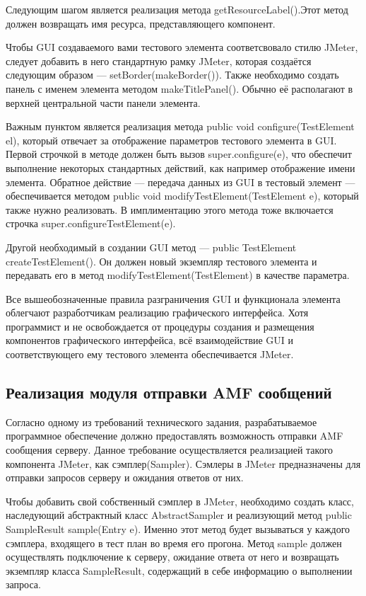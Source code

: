 Следующим шагом является реализация метода getResourceLabel().Этот метод должен возвращать имя ресурса,
представляющего компонент.

Чтобы GUI создаваемого вами тестового элемента соответсвовало стилю JMeter, следует добавить в него стандартную
рамку JMeter, которая создаётся следующим образом --- setBorder(makeBorder()). Также необходимо создать
панель с именем элемента методом makeTitlePanel(). Обычно её располагают в верхней центральной части панели
элемента.

Важным пунктом является реализация метода public void configure(TestElement el), который отвечает за отображение
параметров тестового элемента в GUI. Первой строчкой в методе должен быть вызов super.configure(e), что обеспечит
выполнение некоторых стандартных действий, как например отображение имени элемента. Обратное действие ---
передача данных из GUI в тестовый элемент --- обеспечивается методом public void modifyTestElement(TestElement e),
который также нужно реализовать. В имплиментацию этого метода тоже включается строчка
super.configureTestElement(e).

Другой необходимый в создании GUI метод --- public TestElement createTestElement(). Он должен новый экземпляр
тестового элемента и передавать его в метод modifyTestElement(TestElement) в качестве параметра.

Все вышеобозначенные правила разграничения GUI и функционала элемента облегчают разработчикам реализацию графического
интерфейса. Хотя программист и не освобождается от процедуры создания и размещения компонентов графического
интерфейса, всё взаимодействие GUI и соответствующего ему тестового элемента обеспечивается JMeter.

\subsection{Реализация модуля отправки AMF сообщений}

Согласно одному из требований технического задания, разрабатываемое программное обеспечение должно предоставлять возможность 
отправки AMF сообщения серверу. Данное требование осуществляется реализацией такого компонента JMeter, как сэмплер(Sampler). 
Сэмлеры в JMeter предназначены для отправки запросов серверу и ожидания ответов от них. 

Чтобы добавить свой собственный сэмплер в JMeter, необходимо создать класс, наследующий абстрактный класс AbstractSampler и 
реализующий метод public SampleResult sample(Entry e). Именно этот метод будет вызываться у каждого сэмплера, входящего в 
тест план во время его прогона. Метод sample должен осуществлять подключение к серверу, ожидание ответа от него и возвращать 
экземпляр класса SampleResult, содержащий в себе информацию о выполнении запроса.


